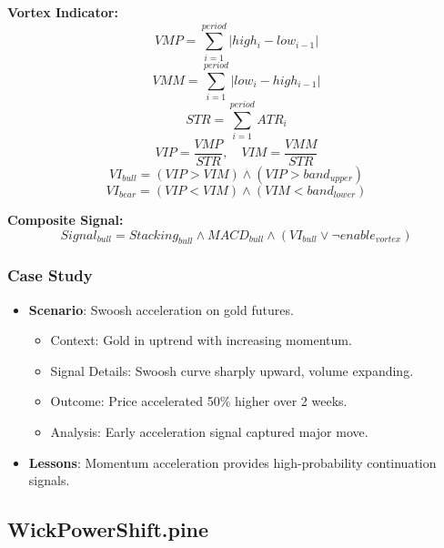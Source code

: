 \documentclass[12pt]{article}
\begin{document}
\textbf{Vortex Indicator:}
\[
VMP = \sum_{i=1}^{period} |high_i - low_{i-1}|
\]
\[
VMM = \sum_{i=1}^{period} |low_i - high_{i-1}|
\]
\[
STR = \sum_{i=1}^{period} ATR_i
\]
\[
VIP = \frac{VMP}{STR}, \quad VIM = \frac{VMM}{STR}
\]
\[
VI_{bull} = (VIP > VIM) \land (VIP > band_{upper})
\]
\[
VI_{bear} = (VIP < VIM) \land (VIM < band_{lower})
\]

\textbf{Composite Signal:}
\[
Signal_{bull} = Stacking_{bull} \land MACD_{bull} \land (VI_{bull} \lor \neg enable_{vortex})
\]

\subsubsection{Case Study}
\begin{itemize}
\item \textbf{Scenario}: Swoosh acceleration on gold futures.
  \begin{itemize}
  \item Context: Gold in uptrend with increasing momentum.
  \item Signal Details: Swoosh curve sharply upward, volume expanding.
  \item Outcome: Price accelerated 50\% higher over 2 weeks.
  \item Analysis: Early acceleration signal captured major move.
  \end{itemize}
\item \textbf{Lessons}: Momentum acceleration provides high-probability continuation signals.
\end{itemize}

\subsection{WickPowerShift.pine}
\label{subsec:wickpower}
\end{document}
